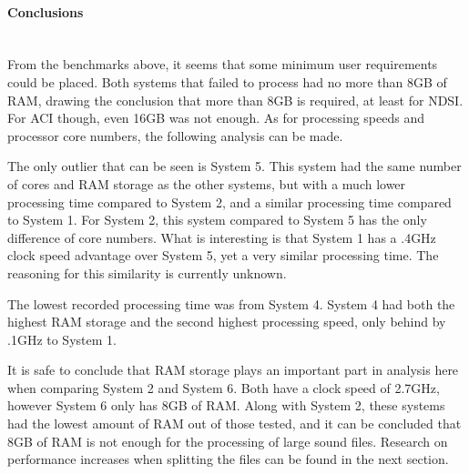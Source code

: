 \paragraph{Conclusions} \mbox{}\\[\paragraphheaderspace]
From the benchmarks above, it seems that some minimum user requirements could be placed. Both systems that failed to process had no more than 8GB of RAM, drawing the conclusion that more than 8GB is required, at least for NDSI. For ACI though, even 16GB was not enough. As for processing speeds and processor core numbers, the following analysis can be made.\par
The only outlier that can be seen is System 5. This system had the same number of cores and RAM storage as the other systems, but with a much lower processing time compared to System 2, and a similar processing time compared to System 1. For System 2, this system compared to System 5 has the only difference of core numbers. What is interesting is that System 1 has a .4GHz clock speed advantage over System 5, yet a very similar processing time. The reasoning for this similarity is currently unknown.\par
The lowest recorded processing time was from System 4. System 4 had both the highest RAM storage and the second highest processing speed, only behind by .1GHz to System 1.\par
It is safe to conclude that RAM storage plays an important part in analysis here when comparing System 2 and System 6. Both have a clock speed of 2.7GHz, however System 6 only has 8GB of RAM. Along with System 2, these systems had the lowest amount of RAM out of those tested, and it can be concluded that 8GB of RAM is not enough for the processing of large sound files. Research on performance increases when splitting the files can be found in the next section.
